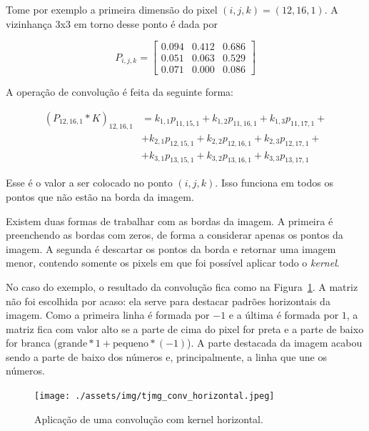 \documentclass[12pt,twoside,brazilian]{book}
\begin{document}
Tome por exemplo a primeira dimensão do pixel \((i,j,k) = (12,16,1)\). A
vizinhança 3x3 em torno desse ponto é dada por

\[
P_{i,j,k} = \left[\begin{array}{rrr}
0.094 & 0.412 & 0.686 \\ 
0.051 & 0.063 & 0.529 \\ 
0.071 & 0.000 & 0.086 
\end{array}\right]
\]

A operação de convolução é feita da seguinte forma:

\[
\begin{aligned}
(P_{12,16,1} *K )_{12,16,1}
&= k_{1,1}p_{11,15,1} + k_{1,2}p_{11,16,1} + k_{1,3}p_{11,17,1} + \\
&+ k_{2,1}p_{12,15,1} + k_{2,2}p_{12,16,1} + k_{2,3}p_{12,17,1} + \\
&+ k_{3,1}p_{13,15,1} + k_{3,2}p_{13,16,1} + k_{3,3}p_{13,17,1}
\end{aligned}
\]

Esse é o valor a ser colocado no ponto \((i,j,k)\). Isso funciona em
todos os pontos que não estão na borda da imagem.

Existem duas formas de trabalhar com as bordas da imagem. A primeira é
preenchendo as bordas com zeros, de forma a considerar apenas os pontos
da imagem. A segunda é descartar os pontos da borda e retornar uma
imagem menor, contendo somente os pixels em que foi possível aplicar
todo o \emph{kernel}.

No caso do exemplo, o resultado da convolução fica como na
Figura~\ref{fig-tjmg-exemplo-conv-horizontal}. A matriz não foi
escolhida por acaso: ela serve para destacar padrões horizontais da
imagem. Como a primeira linha é formada por \(-1\) e a última é formada
por \(1\), a matriz fica com valor alto se a parte de cima do pixel for
preta e a parte de baixo for branca
(\(\text{grande} * 1 + \text{pequeno} * (-1)\)). A parte destacada da
imagem acabou sendo a parte de baixo dos números e, principalmente, a
linha que une os números.

\begin{figure}

{\centering \texttt{[image: ./assets/img/tjmg\_conv\_horizontal.jpeg]}

}

\caption{\label{fig-tjmg-exemplo-conv-horizontal}Aplicação de uma
convolução com kernel horizontal.}

\end{figure}
\end{document}
